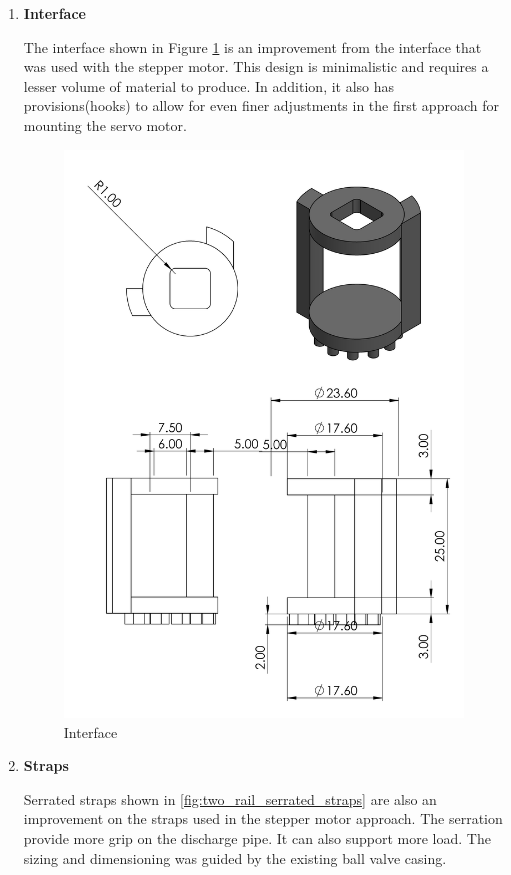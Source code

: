 \begin{enumerate}
\begin{enumerate}
    \item \textbf{Interface}
    \par
    The interface shown in Figure \ref{fig:interface2} is an improvement from the interface that was used with the stepper motor. This design is minimalistic and requires a lesser volume of material to produce. In addition, it also has provisions(hooks) to allow for even finer adjustments in the first approach for mounting the servo motor.
    \begin{figure}[H]
        \centering
        \includegraphics[height=.5\textheight]{Figures/Interface2.PNG}
        \caption{Interface}
        \label{fig:interface2}
    \end{figure}
    \par
    \item \textbf{Straps}
    \par
    Serrated straps shown in \ref{fig:two_rail_serrated_straps} are also an improvement on the straps used in the stepper motor approach. The serration provide more grip on the discharge pipe. It can also support more load. The sizing and dimensioning was guided by the existing ball valve casing.

\end{enumerate}
\end{enumerate}

